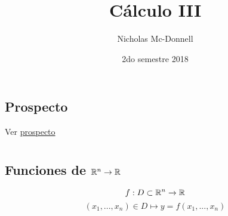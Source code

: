 

\title{Cálculo III}
\author{Nicholas Mc-Donnell}
\date{2do semestre 2018}


    \maketitle
    \newpage
    \tableofcontents
    \newpage
    \section*{Prospecto}
    Ver \href{run:Prospecto.pdf}{prospecto}

    \chapter{}
    \section{Funciones de $\mathbb{R}^n\rightarrow\mathbb{R}$}
    \[f:D\subset\mathbb{R}^n\xrightarrow[]{}\mathbb{R}\]
    \[(x_1,...,x_n)\in D\mapsto y=f(x_1,...,x_n)\]
